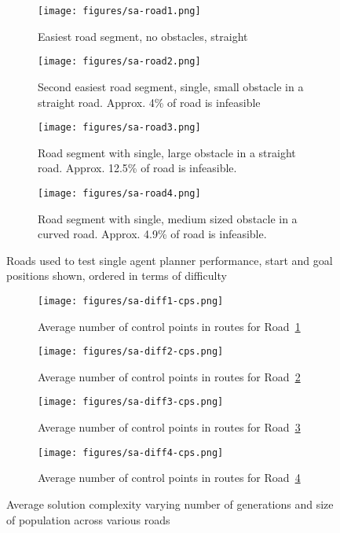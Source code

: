 \begin{figure}
  \centering
  \begin{subfigure}[b]{0.44\textwidth}
    \centering
    \texttt{[image: figures/sa-road1.png]}
    \caption{\label{subfig:sa-road1}Easiest road segment, no obstacles, straight}
  \end{subfigure}
  \begin{subfigure}[b]{0.44\textwidth}
    \centering
    \texttt{[image: figures/sa-road2.png]}
    \caption{\label{subfig:sa-road2}Second easiest road segment, single, small obstacle in a straight road. Approx. 4\% of road is infeasible}
  \end{subfigure}
  \begin{subfigure}[b]{0.44\textwidth}
    \centering
    \texttt{[image: figures/sa-road3.png]}
    \caption{\label{subfig:sa-road3}Road segment with single, large obstacle in a straight road. Approx. 12.5\% of road is infeasible.}
  \end{subfigure}
  \begin{subfigure}[b]{0.44\textwidth}
    \centering
    \texttt{[image: figures/sa-road4.png]}
    \caption{\label{subfig:sa-road4}Road segment with single, medium sized obstacle in a curved road. Approx. 4.9\% of road is infeasible.}
  \end{subfigure}
  \caption{\label{fig:single-agent-roads} Roads used to test single agent planner performance, start and goal positions shown, ordered in terms of difficulty}
\end{figure}

\begin{figure}
  \centering
  \begin{subfigure}[b]{0.44\textwidth}
    \centering
    \texttt{[image: figures/sa-diff1-cps.png]}
    \caption{\label{subfig:sa-diff1-cps}Average number of control points in routes for Road~\ref{subfig:sa-road1}}
  \end{subfigure}
  \begin{subfigure}[b]{0.44\textwidth}
    \centering
    \texttt{[image: figures/sa-diff2-cps.png]}
    \caption{\label{subfig:sa-diff2-cps}Average number of control points in routes for Road~\ref{subfig:sa-road2}}
  \end{subfigure}
  \begin{subfigure}[b]{0.44\textwidth}
    \centering
    \texttt{[image: figures/sa-diff3-cps.png]}
    \caption{\label{subfig:sa-diff3-cps}Average number of control points in routes for Road~\ref{subfig:sa-road3}}
  \end{subfigure}
  \begin{subfigure}[b]{0.44\textwidth}
    \centering
    \texttt{[image: figures/sa-diff4-cps.png]}
    \caption{\label{subfig:sa-diff4-cps}Average number of control points in routes for Road~\ref{subfig:sa-road4}}
  \end{subfigure}
  \caption{\label{fig:single-agent-cps} Average solution complexity varying number of generations and size of population across various roads}
\end{figure}

